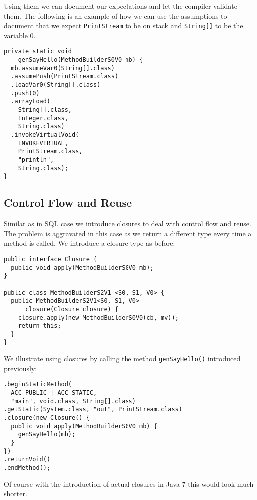 \documentclass{sig-alternate}
\begin{document}
Using them we can document our expectations and let the compiler validate them. The following is an example of how we can use the assumptions to document that we expect \verb!PrintStream! to be on stack and \verb!String[]! to be the variable $0$.

\begin{verbatim}
private static void 
    genSayHello(MethodBuilderS0V0 mb) {
  mb.assumeVar0(String[].class)
  .assumePush(PrintStream.class)
  .loadVar0(String[].class)
  .push(0)
  .arrayLoad(
    String[].class, 
    Integer.class,
    String.class)
  .invokeVirtualVoid(
    INVOKEVIRTUAL, 
    PrintStream.class, 
    "println", 
    String.class);
}
\end{verbatim}

\subsection{Control Flow and Reuse}

Similar as in SQL case we introduce closures to deal with control flow and reuse. The problem is aggravated in this case as we return a different type every time a method is called. We introduce a closure type as before:

\begin{verbatim}
public interface Closure {
  public void apply(MethodBuilderS0V0 mb);
}

public class MethodBuilderS2V1 <S0, S1, V0> {
  public MethodBuilderS2V1<S0, S1, V0> 
      closure(Closure closure) {
    closure.apply(new MethodBuilderS0V0(cb, mv));
    return this;
  }
}
\end{verbatim}

We illustrate using closures by calling the method \verb!genSayHello()! introduced previously:

\begin{verbatim}
.beginStaticMethod(
  ACC_PUBLIC | ACC_STATIC, 
  "main", void.class, String[].class)
.getStatic(System.class, "out", PrintStream.class)
.closure(new Closure() {
  public void apply(MethodBuilderS0V0 mb) {
    genSayHello(mb);
  }
})
.returnVoid()
.endMethod();
\end{verbatim}

Of course with the introduction of actual closures in Java 7 this would look much shorter.

\end{document}
